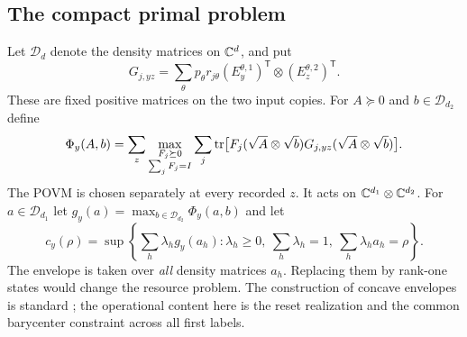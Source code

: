 \subsection{The compact primal problem}
Let $\mathcal D_d$ denote the density matrices on $\mathbb C^d$, and put
\begin{equation}\label{eq:gameblocks91}
 G_{j,yz}=\sum_\theta p_\theta r_{j\theta}
     (E_y^{\theta,1})^{\mathsf T}\otimes(E_z^{\theta,2})^{\mathsf T}.
\end{equation}
These are fixed positive matrices on the two input copies.  For
$A\succeq0$ and $b\in\mathcal D_{d_2}$ define
\begin{equation}\label{eq:leafvalue91}
 \Phi_y(A,b)=\sum_z\max_{\substack{F_j\succeq0\\\sum_jF_j=I}}
 \sum_j\operatorname{tr}\bigl[F_j(\sqrt A\otimes\sqrt b)
            G_{j,yz}(\sqrt A\otimes\sqrt b)\bigr].
\end{equation}
The POVM is chosen separately at every recorded $z$.  It acts on
$\mathbb C^{d_1}\otimes\mathbb C^{d_2}$.  For $a\in\mathcal D_{d_1}$ let
$g_y(a)=\max_{b\in\mathcal D_{d_2}}\Phi_y(a,b)$ and let
\begin{equation}\label{eq:roof91}
 c_y(\rho)=\sup\left\{\sum_h\lambda_h g_y(a_h):
 \lambda_h\ge0,\ \sum_h\lambda_h=1,\
 \sum_h\lambda_ha_h=\rho\right\}.
\end{equation}
The envelope is taken over \emph{all} density matrices $a_h$.  Replacing
them by rank-one states would change the resource problem.  The
construction of concave envelopes is standard \cite{Uhlmann91}; the
operational content here is the reset realization and the common
barycenter constraint across all first labels.

